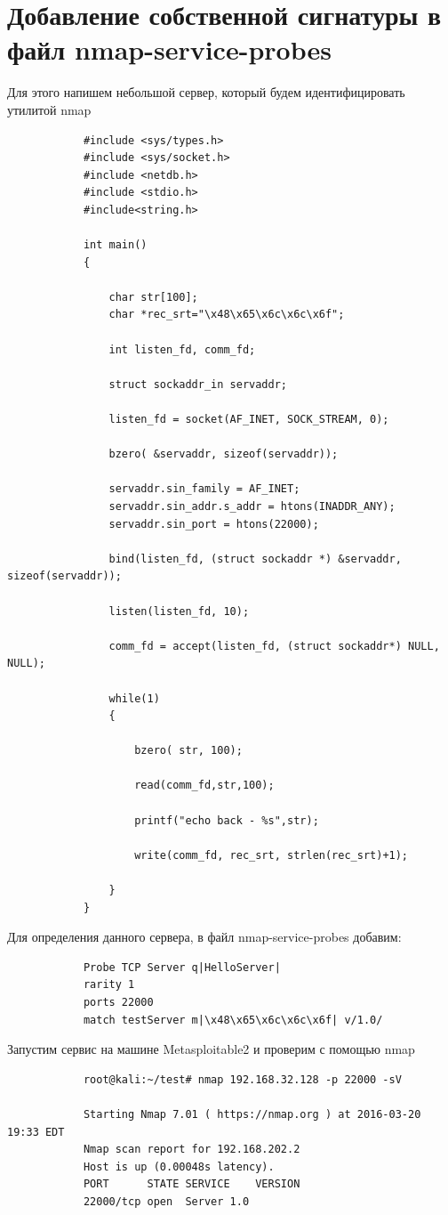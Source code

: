 \documentclass[10pt,a4paper]{report}
\begin{document}
\section{Добавление собственной сигнатуры в файл nmap-service-probes}
Для этого напишем небольшой сервер, который будем идентифицировать утилитой nmap
\begin{verbatim}
			#include <sys/types.h>
			#include <sys/socket.h>
			#include <netdb.h>
			#include <stdio.h>
			#include<string.h>
			
			int main()
			{
			
				char str[100];
				char *rec_srt="\x48\x65\x6c\x6c\x6f";
			
				int listen_fd, comm_fd;
			
				struct sockaddr_in servaddr;
			
				listen_fd = socket(AF_INET, SOCK_STREAM, 0);
			
				bzero( &servaddr, sizeof(servaddr));
			
				servaddr.sin_family = AF_INET;
				servaddr.sin_addr.s_addr = htons(INADDR_ANY);
				servaddr.sin_port = htons(22000);
			
				bind(listen_fd, (struct sockaddr *) &servaddr, sizeof(servaddr));
			
				listen(listen_fd, 10);
			
				comm_fd = accept(listen_fd, (struct sockaddr*) NULL, NULL);
			
				while(1)
				{
			
					bzero( str, 100);
			
					read(comm_fd,str,100);
			
					printf("echo back - %s",str);
			
					write(comm_fd, rec_srt, strlen(rec_srt)+1);
			
				}
			}
		\end{verbatim}		
Для определения данного сервера, в файл nmap-service-probes добавим:
\begin{verbatim}
			Probe TCP Server q|HelloServer|
			rarity 1
			ports 22000
			match testServer m|\x48\x65\x6c\x6c\x6f| v/1.0/
		\end{verbatim}	
Запустим сервис на машине Metasploitable2 и проверим с помощью nmap \begin{verbatim}
			root@kali:~/test# nmap 192.168.32.128 -p 22000 -sV
			
			Starting Nmap 7.01 ( https://nmap.org ) at 2016-03-20 19:33 EDT
			Nmap scan report for 192.168.202.2
			Host is up (0.00048s latency).
			PORT      STATE SERVICE    VERSION
			22000/tcp open  Server 1.0
		\end{verbatim}
	
\end{document}
